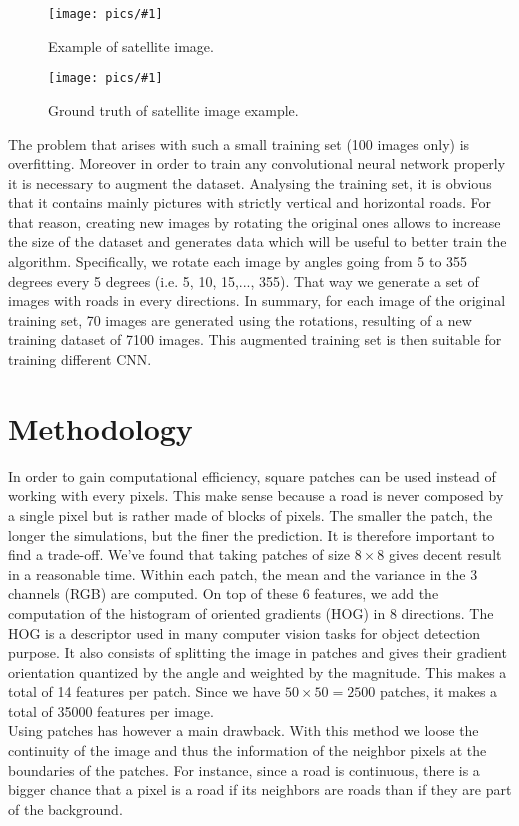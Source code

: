 \documentclass[10pt,conference,compsocconf]{IEEEtran}
\newcommand{\scalefig}[4]{
  \begin{figure}[ht!]
    \centering
    \texttt{[image: pics/\#1]}
 \caption{#3}
    \label{#4}
  \end{figure}}
\begin{document}
\scalefig{satImage}{0.8}{Example of satellite image.}{fig:satImage}
\scalefig{satImage_gt}{0.8}{Ground truth of satellite image example.}{fig:satImage}

The problem that arises with such a small training set (100 images only) is overfitting. Moreover in order to train any convolutional neural network properly it is necessary to augment the dataset. Analysing the training set, it is obvious that it contains mainly pictures with strictly vertical and horizontal roads. For that reason, creating new images by rotating the original ones allows to increase the size of the dataset and generates data which will be useful to better train the algorithm. Specifically, we rotate each image by angles going from 5 to 355 degrees every 5 degrees (i.e. 5, 10, 15,..., 355). That way we generate a set of images with roads in every directions. In summary, for each image of the original training set, 70 images are generated using the rotations, resulting of a new training dataset of 7100 images. This augmented training set is then suitable for training different CNN. \\


\section{Methodology}
In order to gain computational efficiency, square patches can be used instead of working with every pixels. This make sense because a road is never composed by a single pixel but is rather made of blocks of pixels. The smaller the patch, the longer the simulations, but the finer the prediction. It is therefore important to find a trade-off. We've found that taking patches of size $8 \times 8$ gives decent result in a reasonable time. Within each patch, the mean and the variance in the 3 channels (RGB) are computed. On top of these 6 features, we add  the computation of the histogram of oriented gradients (HOG) in 8 directions. The HOG is a descriptor used in many computer vision tasks for object detection purpose. It also consists of splitting the image in patches and gives their gradient orientation quantized by the angle and weighted by the magnitude. This makes a total of 14 features per patch. Since we have $50 \times 50 = 2500$ patches, it makes a total of 35000 features per image.\\

Using patches has however a main drawback. With this method we loose the continuity of the image and thus the information of the neighbor pixels at the boundaries of the patches. For instance, since a road is continuous, there is a bigger chance that a pixel is a road if its neighbors are roads than if they are part of the background.\\
\end{document}
